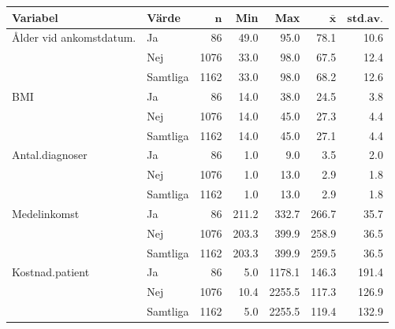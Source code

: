 \begin{table}[ht]
\centering
{\footnotesize
\begin{tabular}{llrrrrr}
 \textbf{Variabel} & \textbf{Värde} & $\mathbf{n}$ & \textbf{Min} & \textbf{Max} & $\mathbf{\bar{x}}$ & $\mathbf{std.av.}$ \\ 
  \hline
Ålder vid ankomstdatum. & Ja &   86 &  49.0 &   95.0 &  78.1 &  10.6 \\ 
   & Nej & 1076 &  33.0 &   98.0 &  67.5 &  12.4 \\ 
   \hline
 & Samtliga & 1162 &  33.0 &   98.0 &  68.2 &  12.6 \\ 
   \hline
BMI & Ja &   86 &  14.0 &   38.0 &  24.5 &   3.8 \\ 
   & Nej & 1076 &  14.0 &   45.0 &  27.3 &   4.4 \\ 
   \hline
 & Samtliga & 1162 &  14.0 &   45.0 &  27.1 &   4.4 \\ 
   \hline
Antal.diagnoser & Ja &   86 &   1.0 &    9.0 &   3.5 &   2.0 \\ 
   & Nej & 1076 &   1.0 &   13.0 &   2.9 &   1.8 \\ 
   \hline
 & Samtliga & 1162 &   1.0 &   13.0 &   2.9 &   1.8 \\ 
   \hline
Medelinkomst & Ja &   86 & 211.2 &  332.7 & 266.7 &  35.7 \\ 
   & Nej & 1076 & 203.3 &  399.9 & 258.9 &  36.5 \\ 
   \hline
 & Samtliga & 1162 & 203.3 &  399.9 & 259.5 &  36.5 \\ 
   \hline
Kostnad.patient & Ja &   86 &   5.0 & 1178.1 & 146.3 & 191.4 \\ 
   & Nej & 1076 &  10.4 & 2255.5 & 117.3 & 126.9 \\ 
   \hline
 & Samtliga & 1162 &   5.0 & 2255.5 & 119.4 & 132.9 \\ 
   \hline
\end{tabular}
}
\end{table}


